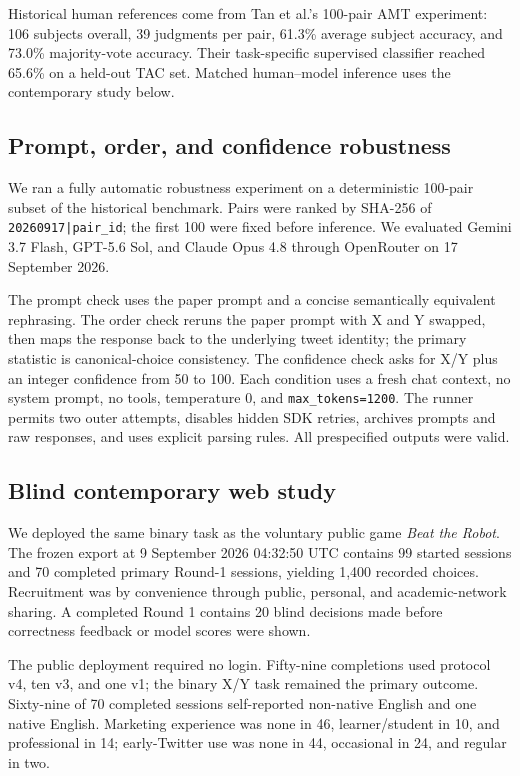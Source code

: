 \documentclass[10pt,twocolumn]{article}
\begin{document}
Historical human references come from Tan et al.'s 100-pair AMT experiment: 106 subjects overall, 39 judgments per pair, 61.3\% average subject accuracy, and 73.0\% majority-vote accuracy. Their task-specific supervised classifier reached 65.6\% on a held-out TAC set. Matched human--model inference uses the contemporary study below.

\subsection{Prompt, order, and confidence robustness}
We ran a fully automatic robustness experiment on a deterministic 100-pair subset of the historical benchmark. Pairs were ranked by SHA-256 of \texttt{20260917|pair\_id}; the first 100 were fixed before inference. We evaluated Gemini 3.7 Flash, GPT-5.6 Sol, and Claude Opus 4.8 through OpenRouter on 17 September 2026.

The prompt check uses the paper prompt and a concise semantically equivalent rephrasing. The order check reruns the paper prompt with X and Y swapped, then maps the response back to the underlying tweet identity; the primary statistic is canonical-choice consistency. The confidence check asks for X/Y plus an integer confidence from 50 to 100. Each condition uses a fresh chat context, no system prompt, no tools, temperature 0, and \texttt{max\_tokens=1200}. The runner permits two outer attempts, disables hidden SDK retries, archives prompts and raw responses, and uses explicit parsing rules. All prespecified outputs were valid.

\subsection{Blind contemporary web study}
We deployed the same binary task as the voluntary public game \emph{Beat the Robot}. The frozen export at 9 September 2026 04:32:50 UTC contains 99 started sessions and 70 completed primary Round-1 sessions, yielding 1,400 recorded choices. Recruitment was by convenience through public, personal, and academic-network sharing. A completed Round 1 contains 20 blind decisions made before correctness feedback or model scores were shown.

The public deployment required no login. Fifty-nine completions used protocol v4, ten v3, and one v1; the binary X/Y task remained the primary outcome. Sixty-nine of 70 completed sessions self-reported non-native English and one native English. Marketing experience was none in 46, learner/student in 10, and professional in 14; early-Twitter use was none in 44, occasional in 24, and regular in two.
\end{document}

